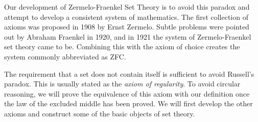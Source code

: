         Our development of Zermelo-Fraenkel Set Theory is to avoid this
        paradox and attempt to develop a consistent system of mathematics.
        The first collection of axioms was proposed in 1908 by Ernst
        Zermelo. Subtle problems were pointed out by Abraham Fraenkel
        in 1920, and in 1921 the system of Zermelo-Fraenkel set theory came
        to be. Combining this with the axiom of choice creates the system
        commonly abbreviated as ZFC.
        \par\hfill\par
        The requirement that a set does not contain itself is sufficient to
        avoid Russell's paradox. This is usually stated as the
        \textit{axiom of regularity}. To avoid circular reasoning, we will
        prove the equivalence of this axiom with our definition once the law
        of the excluded middle has been proved. We will first develop the
        other axioms and construct some of the basic objects of set theory.
